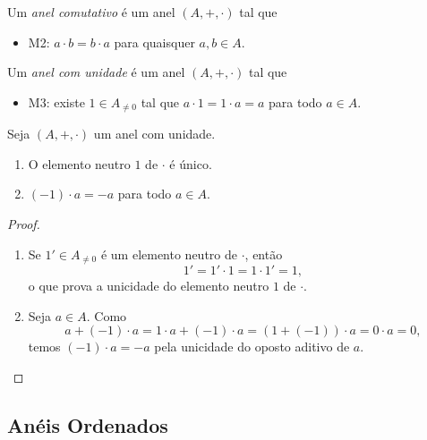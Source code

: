 \begin{definition}
    Um \emph{anel comutativo} é um anel $(A, +, \cdot)$ tal que
        \begin{itemize}
            \item M2: $a \cdot b = b \cdot a$ para quaisquer $a,b \in A$.
        \end{itemize}
\end{definition}

\begin{definition}
    Um \emph{anel com unidade} é um anel $(A, +, \cdot)$ tal que
        \begin{itemize}
            \item M3: existe $1 \in A_{\neq 0}$ tal que $a \cdot 1 = 1 \cdot a = a$ para todo $a \in A$.
        \end{itemize}
\end{definition}

\begin{proposition}
    Seja $(A, +, \cdot)$ um anel com unidade.
        \begin{enumerate}[leftmargin=*, align=left, label=\textbf{(\alph*)}]
            \item O elemento neutro $1$ de $\cdot$ é único.
            \item $(-1) \cdot a = -a$ para todo $a \in A$.
        \end{enumerate}
\end{proposition}

\begin{proof}
    \leavevmode
        \begin{enumerate}[leftmargin=*, align=left, label=\textbf{(\alph*)}]
            \item Se $1' \in A_{\neq 0}$ é um elemento neutro de $\cdot$, então
                \[
                    1' = 1' \cdot 1 = 1 \cdot 1' = 1,
                \]
            o que prova a unicidade do elemento neutro $1$ de $\cdot$. \blackproof
            \item Seja $a \in A$. Como 
                \[
                    a + (-1) \cdot a = 1 \cdot a + (-1) \cdot a = (1 + (-1)) \cdot a = 0 \cdot a = 0,
                \]
            temos $(-1) \cdot a = -a$ pela unicidade do oposto aditivo de $a$. \blackproof
        \end{enumerate}
\end{proof}

\subsection{Anéis Ordenados}

